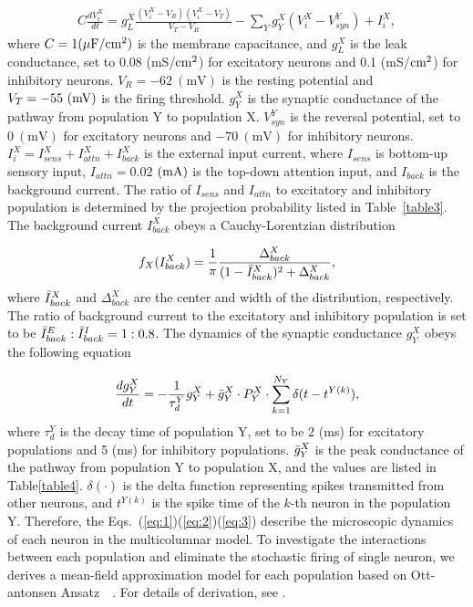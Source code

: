 \documentclass[10pt,letterpaper]{article}
\begin{document}
\begin{eqnarray}
\label{eq:1}
    C\frac{dV_{i}^{X}}{dt} = g_{L}^{X}\frac{(V_{i}^{X}-V_{R})(V_{i}^{X}-V_{T})}{V_{T}-V_{R}}-\sum_{Y}g_{Y}^{X}(V_{i}^{X}-V_{syn}^{Y}) + I_{i}^{X},
\end{eqnarray}
where $C=1(\rm \mu F/cm^2)$ is the membrane capacitance, and $g_{L}^{X}$ is the leak conductance, set to 0.08 (mS/$\rm cm^{2}$) for excitatory neurons and 0.1 (mS/$\rm cm^{2}$) for inhibitory neurons. $V_{R}=-62\ \mathrm{(mV)}$ is the resting potential and $V_{T}=-55\ (\rm mV)$ is the firing threshold. $g_{Y}^{X}$ is the synaptic conductance of the pathway from population Y to population X. $V_{syn}^{Y}$ is the reversal potential, set to  $0\ \mathrm{(mV)}$ for excitatory neurons and $-70\ \mathrm{(mV)}$ for inhibitory neurons. $I_{i}^{X}=I_{sens}^{X} + I_{attn}^{X} + I_{back}^{X}$ is the external input current, where $I_{sens}$ is bottom-up sensory input, $I_{attn}=0.02$ $(\rm mA)$ is the top-down attention input, and $I_{back}$ is the background current. The ratio of $I_{sens}$ and $I_{attn}$ to excitatory and inhibitory population is determined by the projection probability listed in Table~\ref{table3}. The background current $I_{back}^{X}$ obeys a Cauchy-Lorentzian distribution

\begin{eqnarray}
\label{eq:2}
        f_{X}(I_{back}^{X}) = \frac{1}{\pi}\frac{\Delta_{back}^{X}}{(1-\Bar{I}_{back}^{X})^{2}+\Delta_{back}^{X}},
\end{eqnarray}
where $\Bar{I}_{back}^{X}$ and $\Delta_{back}^{X}$ are the center and width of the distribution, respectively. The ratio of background current to the excitatory and inhibitory population is set to be $\Bar{I}_{back}^{E} : \Bar{I}_{back}^{I} = 1:0.8$. The dynamics of the synaptic conductance $g_{Y}^{X}$ obeys the following equation

\begin{eqnarray}
\label{eq:3}
    \frac{dg_{Y}^{X}}{dt} = -\frac{1}{\tau_{d}^{Y}}g_{Y}^{X}+\Bar{g}_{Y}^{X}\cdot P_{Y}^{X}\cdot\sum_{k=1}^{N_{Y}}\delta(t-t^{Y(k)}),
\end{eqnarray}
where $\tau_{d}^{Y}$ is the decay time of population Y, set to be 2 (ms) for excitatory populations and 5 (ms) for inhibitory populations. $\Bar{g}_{Y}^{X}$ is the peak conductance of the pathway from population Y to population X, and the values are listed in Table\ref{table4}. $\delta(\cdot)$ is the delta function representing spikes transmitted from other neurons, and $t^{Y(k)}$ is the spike time of the $k$-th neuron in the population Y. Therefore, the Eqs.~(\ref{eq:1})(\ref{eq:2})(\ref{eq:3}) describe the microscopic dynamics of each neuron in the multicolumnar model. To investigate the interactions between each population and eliminate the stochastic firing of single neuron, we derives a mean-field approximation model for each population based on Ott-antonsen Ansatz~\cite{ott2008}~\cite{montbrio2015}. For details of derivation, see .
\end{document}
